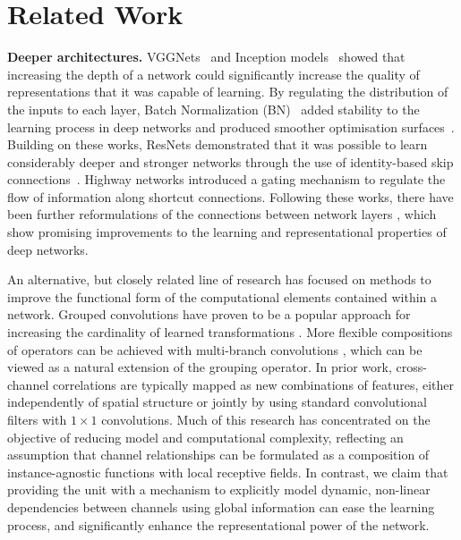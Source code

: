 \section{Related Work\label{sec:related}}

\noindent\textbf{Deeper architectures.} %
%
VGGNets~\cite{simonyan_iclr2015vgg} and Inception models~\cite{szegedy_cvpr2015googlenet} showed that increasing the depth of a network could significantly increase the quality of representations that it was capable of learning. By regulating the distribution of the inputs to each layer, Batch Normalization (BN)~\cite{ioffe_icml2015bn} added stability to the learning process in deep networks and produced smoother optimisation surfaces~\cite{santurkar_nips2018}. Building on these works, ResNets demonstrated that it was possible to learn considerably deeper and stronger networks through the use of identity-based skip connections~\cite{he_cvpr2016resnet, he_eccv2016preact}. Highway networks \cite{srivastava_nips2015highway} introduced a gating mechanism to regulate the flow of information along shortcut connections. Following these works, there have been further reformulations of the connections between network layers \cite{chen_nips2017dpn, huang_cvpr2017dns}, which show promising improvements to the learning and representational properties of deep networks.


An alternative, but closely related line of research has focused on methods to improve the functional form of the computational elements contained within a network.  Grouped convolutions have proven to be a popular approach for increasing the cardinality of learned transformations \cite{ioannou_cvpr2017roots, xie_cvpr2017resnext}. More flexible compositions of operators can be achieved with multi-branch convolutions \cite{ioffe_icml2015bn, szegedy_cvpr2015googlenet, szegedy_cvpr2016inceptionv3, szegedy_iclrw2016inceptionv4}, which can be viewed as a natural extension of the grouping operator. In prior work, cross-channel correlations are typically mapped as new combinations of features, either independently of spatial structure \cite{max_bmvc2014lowrank, chollet_cvpr2017xception} or jointly by using standard convolutional filters \cite{lin_iclr2014nin} with $1\times1$ convolutions. Much of this research has concentrated on the objective of reducing model and computational complexity, reflecting an assumption that channel relationships can be formulated as a composition of instance-agnostic functions with local receptive fields.  In contrast, we claim that providing the unit with a mechanism to explicitly model dynamic, non-linear dependencies between channels using global information can ease the learning process, and significantly enhance the representational power of the network.


